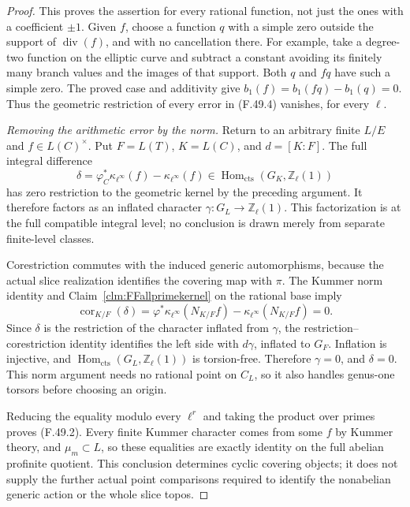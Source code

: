 \documentclass[11pt]{article}
\begin{document}
\begin{proof}
This proves the assertion for every rational
function, not just the ones with a coefficient
\(\pm1\). Given \(f\), choose a function \(q\)
with a simple zero outside the support of
\(\operatorname{div}(f)\), and with no cancellation
there. For example, take a degree-two function on
the elliptic curve and subtract a constant avoiding
its finitely many branch values and the images of
that support. Both \(q\) and \(fq\) have such
a simple zero. The proved case and additivity give
\(b_1(f)=b_1(fq)-b_1(q)=0\).
Thus the geometric restriction of every error in
(F.49.4) vanishes, for every \(\ell\).

\emph{Removing the arithmetic error by the norm.}
Return to an arbitrary finite \(L/E\) and
\(f\in L(C)^\times\). Put
\(F=L(T)\), \(K=L(C)\), and
\(d=[K:F]\). The full integral difference
\[
       \delta=\varphi_C^*\kappa_{\ell^\infty}(f)
                         -\kappa_{\ell^\infty}(f)
          \in\operatorname{Hom}_{\mathrm{cts}}
                     (G_K,\mathbb Z_\ell(1))
                                                        \tag{F.49.8}
\]
has zero restriction to the geometric kernel by
the preceding argument. It therefore factors as
an inflated character
\(\gamma:G_L\to\mathbb Z_\ell(1)\).
This factorization is at the full compatible
integral level; no conclusion is drawn merely
from separate finite-level classes.

Corestriction commutes with the induced generic
automorphisms, because the actual slice realization
identifies the covering map with \(\pi\). The
Kummer norm identity and
Claim~\ref{clm:FFallprimekernel} on the rational
base imply
\[
 \operatorname{cor}_{K/F}(\delta)
       =\varphi^*\kappa_{\ell^\infty}(N_{K/F}f)
                   -\kappa_{\ell^\infty}(N_{K/F}f)=0.
                                                        \tag{F.49.9}
\]
Since \(\delta\) is the restriction of the
character inflated from \(\gamma\), the
restriction--corestriction identity identifies the
left side with \(d\gamma\), inflated to \(G_F\).
Inflation is injective, and
\(\operatorname{Hom}_{\mathrm{cts}}
(G_L,\mathbb Z_\ell(1))\) is torsion-free.
Therefore \(\gamma=0\), and \(\delta=0\).
This norm argument needs no rational point on
\(C_L\), so it also handles genus-one torsors
before choosing an origin.

Reducing the equality modulo every \(\ell^r\)
and taking the product over primes proves
(F.49.2). Every finite Kummer character comes
from some \(f\) by Kummer theory, and
\(\mu_m\subset L\), so these equalities are
exactly identity on the full abelian profinite
quotient. This conclusion determines cyclic
covering objects; it does not supply the further
actual point comparisons required to identify
the nonabelian generic action or the whole slice
topos.
\end{proof}
\end{document}
